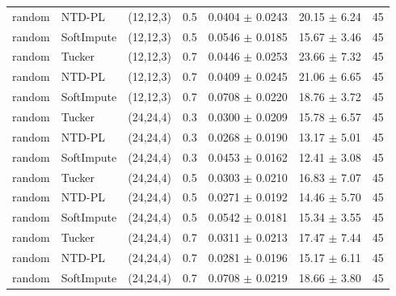 \begin{tabular}{@{}l l c c c c c@{}}
random & NTD-PL & (12,12,3) & 0.5 & 0.0404 $\pm$ 0.0243 & 20.15 $\pm$ 6.24 & 45\\
random & SoftImpute & (12,12,3) & 0.5 & 0.0546 $\pm$ 0.0185 & 15.67 $\pm$ 3.46 & 45\\
random & Tucker & (12,12,3) & 0.7 & 0.0446 $\pm$ 0.0253 & 23.66 $\pm$ 7.32 & 45\\
random & NTD-PL & (12,12,3) & 0.7 & 0.0409 $\pm$ 0.0245 & 21.06 $\pm$ 6.65 & 45\\
random & SoftImpute & (12,12,3) & 0.7 & 0.0708 $\pm$ 0.0220 & 18.76 $\pm$ 3.72 & 45\\
random & Tucker & (24,24,4) & 0.3 & 0.0300 $\pm$ 0.0209 & 15.78 $\pm$ 6.57 & 45\\
random & NTD-PL & (24,24,4) & 0.3 & 0.0268 $\pm$ 0.0190 & 13.17 $\pm$ 5.01 & 45\\
random & SoftImpute & (24,24,4) & 0.3 & 0.0453 $\pm$ 0.0162 & 12.41 $\pm$ 3.08 & 45\\
random & Tucker & (24,24,4) & 0.5 & 0.0303 $\pm$ 0.0210 & 16.83 $\pm$ 7.07 & 45\\
random & NTD-PL & (24,24,4) & 0.5 & 0.0271 $\pm$ 0.0192 & 14.46 $\pm$ 5.70 & 45\\
random & SoftImpute & (24,24,4) & 0.5 & 0.0542 $\pm$ 0.0181 & 15.34 $\pm$ 3.55 & 45\\
random & Tucker & (24,24,4) & 0.7 & 0.0311 $\pm$ 0.0213 & 17.47 $\pm$ 7.44 & 45\\
random & NTD-PL & (24,24,4) & 0.7 & 0.0281 $\pm$ 0.0196 & 15.17 $\pm$ 6.11 & 45\\
random & SoftImpute & (24,24,4) & 0.7 & 0.0708 $\pm$ 0.0219 & 18.66 $\pm$ 3.80 & 45\\
\bottomrule
\end{tabular}
